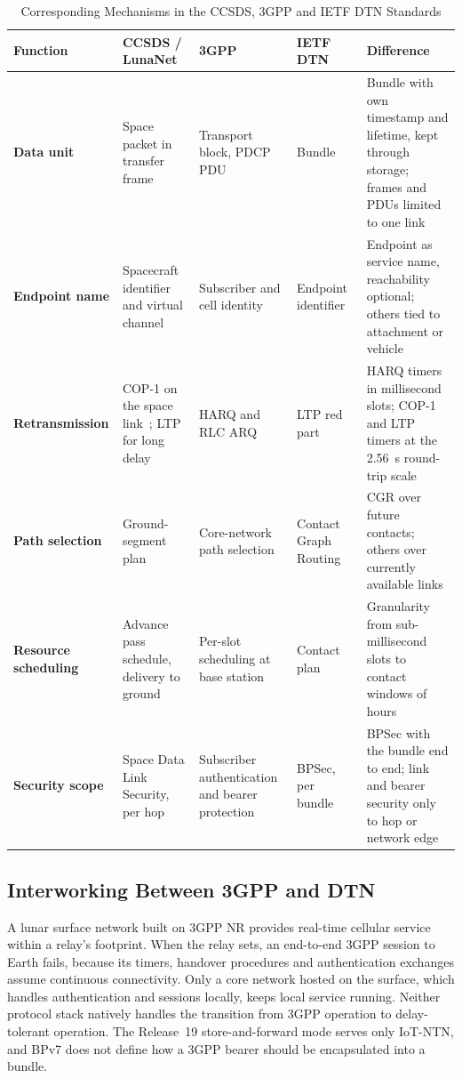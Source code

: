 \documentclass{IEEEoj}
\begin{document}
\begin{table}[!t]
\caption{Corresponding Mechanisms in the CCSDS, 3GPP and IETF DTN Standards}
\label{tab:rosetta}
\centering
\footnotesize
\begin{tabularx}{\textwidth}{@{}>{\raggedright\arraybackslash\bfseries}p{1.9cm}>{\raggedright\arraybackslash}p{2.9cm}>{\raggedright\arraybackslash}p{2.6cm}>{\raggedright\arraybackslash}p{2.5cm}>{\raggedright\arraybackslash}X}
\toprule
\rowcolor{tabhead}\textbf{Function} & \textbf{CCSDS / LunaNet} & \textbf{3GPP} & \textbf{IETF DTN} & \textbf{Difference} \\
\midrule
Data unit & Space packet in transfer frame~\cite{ccsds_tm,ccsds_uslp} & Transport block, PDCP PDU & Bundle~\cite{rfc9171} & Bundle with own timestamp and lifetime, kept through storage; frames and PDUs limited to one link \\
Endpoint name & Spacecraft identifier and virtual channel~\cite{ccsds_uslp} & Subscriber and cell identity & Endpoint identifier~\cite{rfc9171} & Endpoint as service name, reachability optional; others tied to attachment or vehicle \\
Retransmission & COP-1 on the space link~\cite{ccsds_tc}; LTP for long delay~\cite{ccsds_ltp} & HARQ and RLC ARQ & LTP red part~\cite{rfc5326} & HARQ timers in millisecond slots; COP-1 and LTP timers at the \SI{2.56}{s} round-trip scale \\
Path selection & Ground-segment plan & Core-network path selection & Contact Graph Routing~\cite{burleigh_cgr} & CGR over future contacts; others over currently available links \\
Resource scheduling & Advance pass schedule, delivery to ground~\cite{ccsds_sle} & Per-slot scheduling at base station & Contact plan~\cite{fraire_contact_plan} & Granularity from sub-millisecond slots to contact windows of hours \\
Security scope & Space Data Link Security, per hop~\cite{ccsds_sdls} & Subscriber authentication and bearer protection & BPSec, per bundle~\cite{rfc9172} & BPSec with the bundle end to end; link and bearer security only to hop or network edge \\
\bottomrule
\end{tabularx}
\end{table}



\subsection{Interworking Between 3GPP and DTN}
A lunar surface network built on 3GPP NR provides real-time cellular service within a relay's footprint. When the relay sets, an end-to-end 3GPP session to Earth fails, because its timers, handover procedures and authentication exchanges assume continuous connectivity. Only a core network hosted on the surface, which handles authentication and sessions locally, keeps local service running. Neither protocol stack natively handles the transition from 3GPP operation to delay-tolerant operation. The Release~19 store-and-forward mode serves only IoT-NTN, and BPv7 does not define how a 3GPP bearer should be encapsulated into a bundle.
\end{document}
